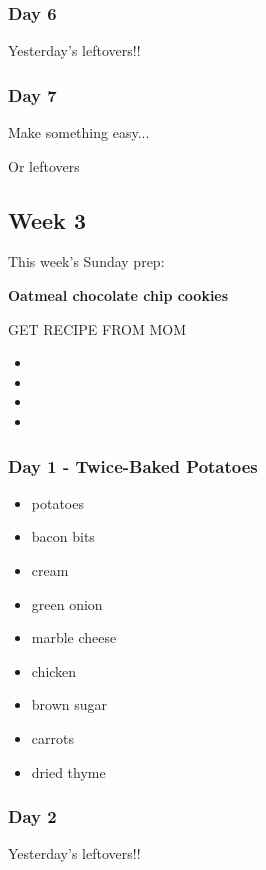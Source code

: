 \documentclass[11pt, a4paper]{article}
\begin{document}
\subsubsection{Day 6}
\vspace{1pc}
Yesterday's leftovers!!

\subsubsection{Day 7}
\vspace{1pc}
\noindent Make something easy...
\par
Or leftovers


\vspace{0.917 pc} %


\pagebreak
\subsection{Week 3}

This week's Sunday prep:
\par
\vspace{1pc}
\noindent\textbf{Oatmeal chocolate chip cookies}
\par
GET RECIPE FROM MOM
\par
\begin{itemize}
\item 
\item 
\item 
\item 
\end{itemize}

\subsubsection{Day 1 - Twice-Baked Potatoes}
\vspace{1pc}
\begin{itemize}
\item potatoes
\item bacon bits
\item cream
\item green onion
\item marble cheese
\item chicken
\item brown sugar
\item carrots
\item dried thyme
\end{itemize}

\subsubsection{Day 2}
\vspace{1pc}
Yesterday's leftovers!!
\end{document}

